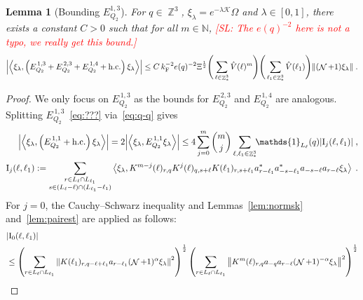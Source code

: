 \documentclass[12pt,a4paper]{article}
\numberwithin{equation}{section}
\newcommand{\cK}{\mathcal{K}}
\newcommand{\NNN}{\mathbb{N}}
\newcommand{\1}{\mathbb{I}}
\newcommand{\F}{\mathrm{F}}
\newcommand{\I}{\mathrm{I}}
\DeclareMathOperator{\Z}{\mathbb{Z}}
\DeclareMathOperator{\NN}{\mathcal{N}}
\newcommand{\half}{\frac{1}{2}}
\newcommand{\eva}[1]{\left\langle #1 \right\rangle}
\theoremstyle{plain}
\newtheorem{lemma}[theorem]{Lemma}
\theoremstyle{definition}
\theoremstyle{remark}
\theoremstyle{plain}
\theoremstyle{definition}
\theoremstyle{remark}
\begin{document}
\begin{lemma}[Bounding $E_{Q_2}^{1,3}$]\label{lem:EQ213}
For $ q \in \Z^3 $, $\xi_\lambda = e^{-\lambda \cK} \Omega$ and $ \lambda \in [0,1] $, there exists a constant $ C > 0 $ such that for all $ m \in \NNN $, \textcolor{red}{[SL: The $ e(q)^{-2} $ here is not a typo, we really get this bound.]}
\begin{equation}
	\abs{\eva{\xi_\lambda,\left(E^{\,1,3}_{Q_2}+E^{\,2,3}_{Q_2}+E^{\,1,4}_{Q_2}+\mathrm{h.c.}\right) \xi_\lambda }} 
	\leq  C\, k_{\F}^{-2} e(q)^{-2} \Xi^{\half}
		\Bigg(\sum\limits_{\ell \in \Z^3_*} \hat{V}(\ell)^m \Bigg)
		\Bigg( \sum\limits_{\ell_1 \in \Z^3_*}\hat{V}(\ell_1) \Bigg)
		\norm { (\NN+1) \xi_\lambda } \;.\label{eq:estEQ213}
\end{equation}
\end{lemma}
\begin{proof}
We only focus on $ E^{\,1,3}_{Q_2} $ as the bounds for $ E^{\,2,3}_{Q_2} $ and $ E^{\,1,4}_{Q_2} $ are analogous. Splitting $ E^{\,1,3}_{Q_2} $~\eqref{eq:???} via~\eqref{eq:q-q} gives
\begin{equation} \label{eq:EQ2131}
\begin{aligned}
	\abs{\eva{\xi_\lambda,\left(E^{\,1,1}_{Q_2}+\mathrm{h.c.}\right) \xi_\lambda }} 
	= 2\abs{\eva{\xi_\lambda, E^{\,1,1}_{Q_2} \xi_\lambda }}
	\le 4 \sum_{j=0}^m {{m}\choose j} \sum\limits_{\ell,\ell_1  \in \Z^3_*}\!\! \mathds{1}_{L_\ell}(q) |\I_j(\ell, \ell_1)| \;,\\
	\I_j(\ell, \ell_1)
	:= \sum\limits_{\substack{r\in L_{\ell} \cap L_{\ell_1}\\ s \in (L_{\ell} - \ell) \cap (L_{\ell_1} - \ell_1)}}
		\eva{\xi_\lambda, K^{m-j}(\ell)_{r,q} K^{j}(\ell)_{q,s+\ell} K(\ell_1)_{r,s+\ell_1} a^*_{r-\ell_1} a^*_{-s-\ell_1} a_{-s-\ell} a_{r-\ell} \xi_\lambda} \;. \\
\end{aligned}
\end{equation}
For $ j = 0 $, the Cauchy--Schwarz inequality and Lemmas~\ref{lem:normsk} and~\ref{lem:pairest} are applied as follows:
\begin{align}
	&|\I_0(\ell, \ell_1)| \nonumber\\
	&\leq \left(\sum\limits_{r\in L_{\ell} \cap L_{\ell_1}} \norm{ K(\ell_1)_{r,q-\ell+\ell_1} a_{r-\ell_1}(\NN+1)^{\alpha} \xi_\lambda}^2\right)^\half
		\left(\sum\limits_{r\in L_{\ell} \cap L_{\ell_1}} \norm{ K^m(\ell)_{r,q} a_{-q}a_{r-\ell} (\NN+1)^{-\alpha} \xi_\lambda }^2 \right)^\half \nonumber\\

\end{align}
\end{proof}
\end{document}
